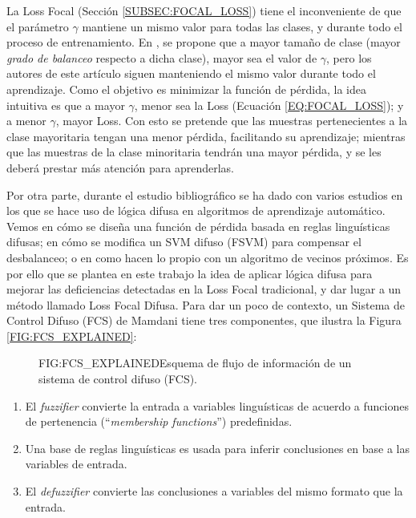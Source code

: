 La Loss Focal (Sección \ref{SUBSEC:FOCAL_LOSS}) tiene el inconveniente de que el parámetro $\gamma$ mantiene un mismo valor para todas las clases, y durante todo el proceso de entrenamiento. En \citet{hong2021fuzzy}, se propone que a mayor tamaño de clase (mayor \textit{grado de balanceo} respecto a dicha clase), mayor sea el valor de $\gamma$, pero los autores de este artículo siguen manteniendo el mismo valor durante todo el aprendizaje. Como el objetivo es minimizar la función de pérdida, la idea intuitiva es que a mayor $\gamma$, menor sea la Loss (Ecuación \ref{EQ:FOCAL_LOSS}); y a menor $\gamma$, mayor Loss. Con esto se pretende que las muestras pertenecientes a la clase mayoritaria tengan una menor pérdida, facilitando su aprendizaje; mientras que las muestras de la clase minoritaria tendrán una mayor pérdida, y se les deberá prestar más atención para aprenderlas.

Por otra parte, durante el estudio bibliográfico se ha dado con varios estudios \cite{patel2017classification,cho2020instance,liu2017fuzzy} en los que se hace uso de lógica difusa en algoritmos de aprendizaje automático. Vemos en \citet{burduk2008possibility} cómo se diseña una función de pérdida basada en reglas linguísticas difusas; en \citet{cho2020instance} cómo se modifica un SVM difuso (FSVM) para compensar el desbalanceo; o en \citet{patel2017classification} como hacen lo propio con un algoritmo de vecinos próximos. Es por ello que se plantea en este trabajo la idea de aplicar lógica difusa para mejorar las deficiencias detectadas en la Loss Focal tradicional, y dar lugar a un método llamado Loss Focal Difusa. Para dar un poco de contexto, un Sistema de Control Difuso (FCS) de Mamdani \cite{mamdani1974application} tiene tres componentes, que ilustra la Figura \ref{FIG:FCS_EXPLAINED}:

\begin{figure}[Esquema de un FCS]{FIG:FCS_EXPLAINED}{Esquema de flujo de información de un sistema de control difuso (FCS).}
\end{figure}

\begin{enumerate}
    \fontsize{11pt}{12pt}\selectfont
    \item El \textit{fuzzifier} convierte la entrada a variables linguísticas de acuerdo a funciones de pertenencia (``\textit{membership functions}'') predefinidas.
    \item Una base de reglas linguísticas es usada para inferir conclusiones en base a las variables de entrada.
    \item El \textit{defuzzifier} convierte las conclusiones a variables del mismo formato que la entrada.
\end{enumerate}

